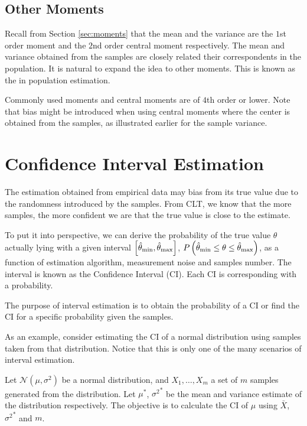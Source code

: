 \subsection{Other Moments}

Recall from Section \ref{sec:moments} that the mean and the variance are the $1$st order moment and the $2$nd order central moment respectively. The mean and variance obtained from the samples are closely related their correspondents in the population. It is natural to expand the idea to other moments. This is known as the  in population estimation.

Commonly used moments and central moments are of $4$th order or lower. Note that bias might be introduced when using central moments where the center is obtained from the samples, as illustrated earlier for the sample variance.

\section{Confidence Interval Estimation}

The estimation obtained from empirical data may bias from its true value due to the randomness introduced by the samples. From CLT, we know that the more samples, the more confident we are that the true value is close to the estimate. 

To put it into perspective, we can derive the probability of the true value $\theta$ actually lying with a given interval $\left[\hat{\theta}_{\textup{min}},\hat{\theta}_{\textup{max}}\right]$, $P\left(\hat{\theta}_{\textup{min}} \leq \theta \leq \hat{\theta}_{\textup{max}}\right)$, as a function of estimation algorithm, measurement noise and samples number. The interval is known as the Confidence Interval (CI). Each CI is corresponding with a probability.

The purpose of interval estimation is to obtain the probability of a CI or find the CI for a specific probability given the samples.

As an example, consider estimating the CI of a normal distribution using samples taken from that distribution. Notice that this is only one of the many scenarios of interval estimation.

Let $\mathcal{N}(\mu,\sigma^2)$ be a normal distribution, and $X_1, \ldots, X_m$ a set of $m$ samples generated from the distribution. Let $\mu^*$, ${\sigma^2}^*$ be the mean and variance estimate of the distribution respectively. The objective is to calculate the CI of $\mu$ using $\bar{X}$, ${\sigma^2}^*$ and $m$.

